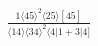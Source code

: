 \documentclass[varwidth, border=5pt]{standalone}
\begin{document}
\begin{my}
$\begin{gathered}
\scriptscriptstyle\frac{1⟨45⟩^2⟨25⟩[45]}{⟨14⟩⟨34⟩^2⟨4|1+3|4]}
\end{gathered}$
\end{my}
\end{document}
